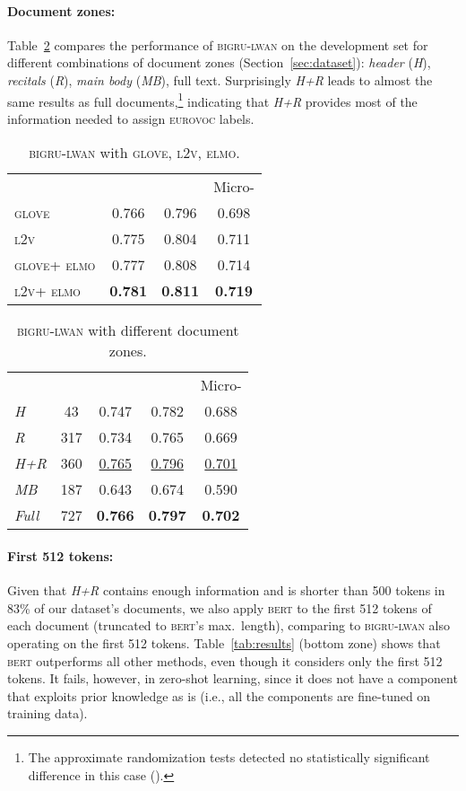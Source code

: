 \documentclass[11pt,a4paper]{article}
\newcommand{\lwangru}{\textsc{bigru-lwan}\xspace}
\newcommand{\glove}{\textsc{glove}\xspace}
\newcommand{\lawvec}{\textsc{l2v}\xspace}
\newcommand{\elmo}{\textsc{elmo}\xspace}
\newcommand{\bert}{\textsc{bert}\xspace}
\newcommand{\eurovoc}{\textsc{eurovoc}\xspace}
\begin{document}
\paragraph{Document zones:} 
Table~\ref{tab:zones} compares the performance of \lwangru on the development set for different combinations of document zones (Section~\ref{sec:dataset}): \emph{header} (\emph{H}), \emph{recitals}  (\emph{R}), \emph{main body} (\emph{MB}), full text. Surprisingly \emph{H+R} leads to almost the same results as full documents,\footnote{The approximate randomization tests detected no statistically significant difference in this case ().} indicating that \emph{H+R} provides most of the information needed to assign \eurovoc labels.

\begin{table}[ht!]
\centering
\footnotesize\addtolength{\tabcolsep}{-2pt}
\begin{tabular}{lccc}
  &  &  & Micro- \\
\cline{2-4}
\glove & 0.766 & 0.796 & 0.698 \\
\lawvec & 0.775 & 0.804 & 0.711 \\
\glove + \elmo & 0.777 & 0.808 & 0.714\\
\lawvec + \elmo & \textbf{0.781} & \textbf{0.811} & \textbf{0.719}\\
\end{tabular}
\caption{\lwangru with \glove, \lawvec, \elmo.}
\label{tab:embs}
\end{table}
\vspace{-0.5em}
\begin{table}[ht!]
\centering
\footnotesize\addtolength{\tabcolsep}{-2pt}
\begin{tabular}{lcccc}
  &  &  &  & Micro- \\
\cline{2-5}
\emph{H} & 43 & 0.747 & 0.782 & 0.688 \\
\emph{R}  & 317 & 0.734 & 0.765 & 0.669 \\
\emph{H+R} & 360 & \underline{0.765} & \underline{0.796} & \underline{0.701} \\
\emph{MB} & 187 & 0.643 & 0.674 & 0.590 \\
\emph{Full} & 727 & \textbf{0.766} & \textbf{0.797} & \textbf{0.702} \\
\end{tabular}
\caption{\lwangru with different document zones.}
\vspace*{-4mm}
\label{tab:zones}
\end{table}


\paragraph{First 512 tokens:} Given that \emph{H+R} contains enough information and is shorter than 500 tokens in 83\% of our dataset's documents, we also apply \bert to the first 512 tokens of each document (truncated to \bert's max.\ length), comparing to \lwangru also operating on the first 512 tokens. Table~\ref{tab:results} (bottom zone) shows that \bert outperforms all other methods, even though it considers only the first 512 tokens. It fails, however, in zero-shot learning, since it does not have a component that exploits prior knowledge as is (i.e., all the components are fine-tuned on training data).
\end{document}
